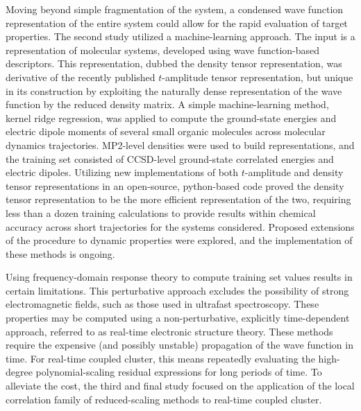 Moving beyond simple fragmentation of the system, a condensed wave function
representation of the entire system could allow for the rapid evaluation of
target properties. The second study utilized a machine-learning approach. The
input is a representation of molecular systems, developed using wave
function-based descriptors. This representation, dubbed the density tensor
representation, was derivative of the recently published $t$-amplitude tensor
representation, but unique in its construction by exploiting the naturally
dense representation of the wave function by the reduced density matrix. A
simple machine-learning method, kernel ridge regression, was applied to
compute the ground-state energies and electric dipole moments of several
small organic molecules across molecular dynamics trajectories. MP2-level
densities were used to build representations, and the training set
consisted of CCSD-level ground-state correlated energies and electric
dipoles. Utilizing new implementations of both $t$-amplitude and density
tensor representations in an open-source, python-based code proved the
density tensor representation to be the more efficient representation
of the two, requiring less than a dozen training calculations to provide
results within chemical accuracy across short trajectories for the systems
considered. Proposed extensions of the procedure to dynamic properties
were explored, and the implementation of these methods is ongoing.

Using frequency-domain response theory to compute training set values
results in certain limitations. This perturbative approach excludes the
possibility of strong electromagnetic fields, such as those used in ultrafast
spectroscopy. These properties may be computed using a non-perturbative,
explicitly time-dependent approach, referred to as real-time electronic
structure theory. These methods require the expensive (and possibly unstable)
propagation of the wave function in time. For real-time coupled cluster,
this means repeatedly evaluating the high-degree polynomial-scaling residual
expressions for long periods of time. To alleviate the cost, the third and
final study focused on the application of the local correlation family of
reduced-scaling methods to real-time coupled cluster.

